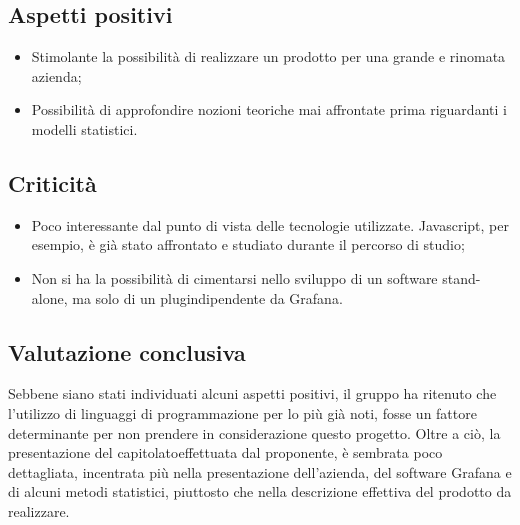 \subsection{Aspetti positivi}
\begin{itemize}
	\item Stimolante la possibilità di realizzare un prodotto per una grande e rinomata azienda;
	\item Possibilità di approfondire nozioni teoriche mai affrontate prima riguardanti i modelli statistici.
\end{itemize}

\subsection{Criticità}
\begin{itemize}
	\item Poco interessante dal punto di vista delle tecnologie utilizzate. Javascript, per esempio, è già stato affrontato e studiato durante il percorso di studio;
	\item Non si ha la possibilità di cimentarsi nello sviluppo di un software stand-alone\glos, ma solo di un plugin\glo dipendente da Grafana. 
\end{itemize}

\subsection{Valutazione conclusiva}
Sebbene siano stati individuati alcuni aspetti positivi, il gruppo ha ritenuto che l'utilizzo di linguaggi di programmazione per lo più già noti, fosse un fattore determinante per non prendere in considerazione questo progetto. Oltre a ciò, la presentazione del capitolato\glo effettuata dal proponente, è sembrata poco dettagliata, incentrata più nella presentazione dell'azienda, del software Grafana e di alcuni metodi statistici, piuttosto che nella descrizione effettiva del prodotto da realizzare.